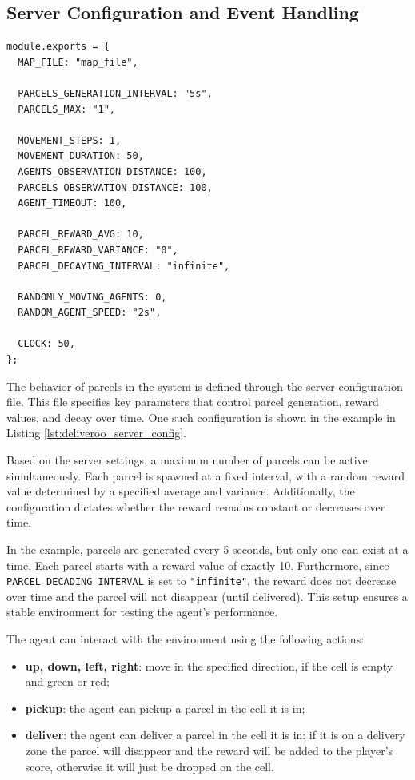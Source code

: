 \subsection{Server Configuration and Event Handling}
\vspace{10mm}
\begin{codewindow}
    \begin{lstlisting}
module.exports = {
  MAP_FILE: "map_file",

  PARCELS_GENERATION_INTERVAL: "5s",
  PARCELS_MAX: "1",

  MOVEMENT_STEPS: 1,
  MOVEMENT_DURATION: 50,
  AGENTS_OBSERVATION_DISTANCE: 100,
  PARCELS_OBSERVATION_DISTANCE: 100,
  AGENT_TIMEOUT: 100,

  PARCEL_REWARD_AVG: 10,
  PARCEL_REWARD_VARIANCE: "0",
  PARCEL_DECAYING_INTERVAL: "infinite",

  RANDOMLY_MOVING_AGENTS: 0,
  RANDOM_AGENT_SPEED: "2s",

  CLOCK: 50,
};
\end{lstlisting}
\end{codewindow}
\vspace{10mm}
The behavior of parcels in the system is defined through the server configuration
file. This file specifies key parameters that control parcel generation, reward values,
and decay over time. One such configuration is shown in the example in Listing \ref{lst:deliveroo_server_config}.

Based on the server settings, a maximum number of parcels can be active
simultaneously. Each parcel is spawned at a fixed interval, with a random reward
value determined by a specified average and variance. Additionally, the
configuration dictates whether the reward remains constant or decreases over
time.

In the example, parcels are generated every 5 seconds, but only one can exist at
a time. Each parcel starts with a reward value of exactly 10. Furthermore, since
\texttt{PARCEL\_DECADING\_INTERVAL} is set to \texttt{"infinite"}, the reward does
not decrease over time and the parcel will not disappear (until delivered). This
setup ensures a stable environment for testing the agent's performance.

The agent can interact with the environment using the following actions:
\begin{itemize}
  \item \textbf{up, down, left, right}: move in the specified direction, if the
    cell is empty and green or red;

  \item \textbf{pickup}: the agent can pickup a parcel in the cell it is in;

  \item \textbf{deliver}: the agent can deliver a parcel in the cell it is in:
    if it is on a delivery zone the parcel will disappear and the reward will be
    added to the player's score, otherwise it will just be dropped on the cell.
\end{itemize}

